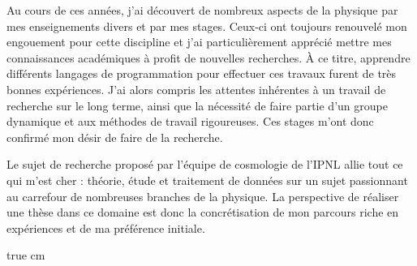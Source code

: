 \documentclass[11pt,a4]{article}
\begin{document}
Au cours de ces années, j'ai découvert de nombreux aspects de la physique par mes enseignements
divers et par mes stages. Ceux-ci ont toujours renouvelé mon engouement pour cette discipline et
j'ai particulièrement apprécié mettre mes connaissances académiques à profit de nouvelles
recherches. À ce titre, apprendre différents langages de programmation pour effectuer ces travaux
furent de très bonnes expériences. J'ai alors compris les attentes inhérentes à un travail de
recherche sur le long terme, ainsi que la nécessité de faire partie d'un groupe dynamique et aux
méthodes de travail rigoureuses. Ces stages m'ont donc confirmé mon désir de faire de la recherche. 

Le sujet de recherche proposé par l'équipe de cosmologie de l'IPNL allie tout ce qui m'est cher :
théorie, étude et traitement de données sur un sujet passionnant au carrefour de nombreuses branches
de la physique. La perspective de réaliser une thèse dans ce domaine est donc la concrétisation de
mon parcours riche en expériences et de ma préférence initiale.

 true cm











\end{document}
